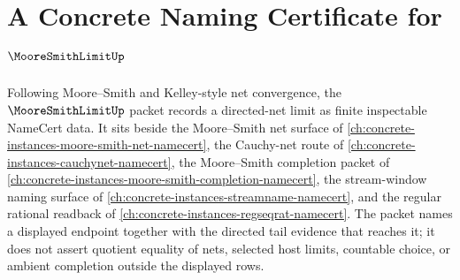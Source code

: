\chapter{A Concrete Naming Certificate for $\MooreSmithLimitUp$}
\label{ch:concrete-instances-moore-smith-limit-namecert}

Following Moore--Smith and Kelley-style net convergence, the $\MooreSmithLimitUp$ packet records a directed-net limit as finite inspectable NameCert data. It sits beside the Moore--Smith net surface of \autoref{ch:concrete-instances-moore-smith-net-namecert}, the Cauchy-net route of \autoref{ch:concrete-instances-cauchynet-namecert}, the Moore--Smith completion packet of \autoref{ch:concrete-instances-moore-smith-completion-namecert}, the stream-window naming surface of \autoref{ch:concrete-instances-streamname-namecert}, and the regular rational readback of \autoref{ch:concrete-instances-regseqrat-namecert}. The packet names a displayed endpoint together with the directed tail evidence that reaches it; it does not assert quotient equality of nets, selected host limits, countable choice, or ambient completion outside the displayed rows.

